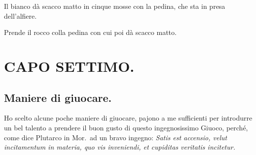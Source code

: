 \documentclass[11pt,a6paper]{article}
\begin{document}
Il bianco dà scacco matto in cinque mosse con la pedina, che sta in presa dell'alfiere.


Prende il rocco colla pedina con cui poi dà scacco matto.


\section{CAPO SETTIMO.}

\subsection{Maniere di giuocare.}

Ho scelto alcune poche maniere di giuocare,
pajono a me sufficienti per introdurre un bel
talento a prendere il buon gusto di questo ingegnosissimo
Giuoco, perché, come dice Plutarco in
Mor.\ ad un bravo ingegno: \textit{Satis est accensio, velut
incitamentum in materia, quo vis inveniendi, et
cupiditas veritatis incitetur.}
\end{document}
